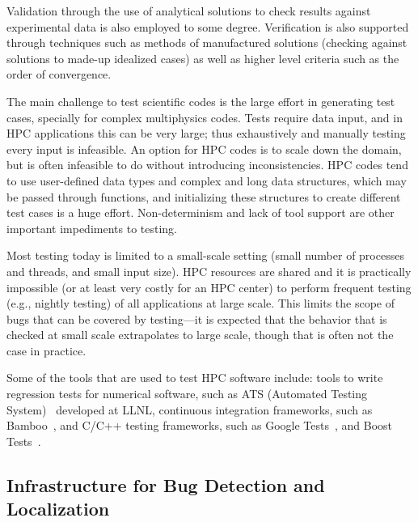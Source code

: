 Validation through the use of analytical solutions to check results 
against experimental data is also employed to some degree.
%
Verification is also supported 
through techniques such as 
methods of manufactured solutions
(checking
against solutions to made-up idealized cases)
as well as higher level criteria such
as the order of convergence.

 

The main challenge to test scientific codes is the large effort in 
generating test cases, specially for complex multiphysics codes. 
Tests require data input, and in HPC applications this can be very large;
thus exhaustively and manually testing every input is infeasible. 
An option for HPC codes is to scale down the domain, but is often 
infeasible to do without introducing inconsistencies.
HPC codes tend to use user-defined data types and complex and long data
structures, which may be passed through functions, and initializing 
these structures to create different test cases is a huge effort. 
Non-determinism and lack of tool support are other important impediments to testing.

Most testing today is limited to a small-scale setting (small number of processes and threads,
and small input size). HPC resources are shared and it is practically 
impossible (or at least very costly for an HPC center) to perform frequent testing 
(e.g., nightly testing) of all applications at large scale.
This limits the scope of bugs that can be covered by testing---it is expected 
that the behavior that is checked at small scale extrapolates to large scale,
though that is often not the case in practice.

Some of the tools that are used to test HPC software include: tools to write 
regression tests for numerical software, such as ATS (Automated Testing System)~\cite{ATS}
developed at LLNL, continuous integration frameworks, such as Bamboo~\cite{Bamboo},
and C/C++ testing frameworks, such as Google Tests~\cite{GoogleTests}, and 
Boost Tests~\cite{BoostTests}.

\subsection{Infrastructure for Bug Detection and Localization}


